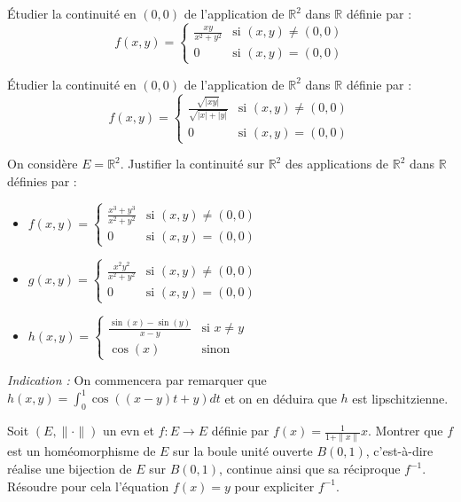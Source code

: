 \begin{exercice}
Étudier la continuité en $(0,0)$ de l'application de $\mathbb{R}^{2}$ dans $\mathbb{R}$ définie par :
$$ f(x,y) = \begin{cases} \frac{xy}{x^{2}+y^{2}} & \text{si } (x,y) \neq (0,0) \\ 0 & \text{si } (x,y) = (0,0) \end{cases} $$
\end{exercice}

\begin{exercice}
Étudier la continuité en $(0,0)$ de l'application de $\mathbb{R}^{2}$ dans $\mathbb{R}$ définie par :
$$ f(x,y) = \begin{cases} \frac{\sqrt{|xy|}}{\sqrt{|x|+|y|}} & \text{si } (x,y) \neq (0,0) \\ 0 & \text{si } (x,y) = (0,0) \end{cases} $$
\end{exercice}

\begin{exercice}
On considère $E=\mathbb{R}^{2}$. Justifier la continuité sur $\mathbb{R}^{2}$ des applications de $\mathbb{R}^{2}$ dans $\mathbb{R}$ définies par :
\begin{itemize}
    \item $f(x,y) = \begin{cases} \frac{x^{3}+y^{3}}{x^{2}+y^{2}} & \text{si } (x,y) \neq (0,0) \\ 0 & \text{si } (x,y) = (0,0) \end{cases}$
    \item $g(x,y) = \begin{cases} \frac{x^{2}y^{2}}{x^{2}+y^{2}} & \text{si } (x,y) \neq (0,0) \\ 0 & \text{si } (x,y) = (0,0) \end{cases}$
    \item $h(x,y) = \begin{cases} \frac{\sin(x)-\sin(y)}{x-y} & \text{si } x \neq y \\ \cos(x) & \text{sinon} \end{cases}$
\end{itemize}
\textit{Indication :} On commencera par remarquer que $h(x,y) = \int_{0}^{1} \cos((x-y)t+y) dt$ et on en déduira que $h$ est lipschitzienne.
\end{exercice}

\begin{exercice}
Soit $(E, \| \cdot \|)$ un evn et $f: E \rightarrow E$ définie par $f(x) = \frac{1}{1+\|x\|}x$.
Montrer que $f$ est un homéomorphisme de $E$ sur la boule unité ouverte $B(0,1)$, c'est-à-dire réalise une bijection de $E$ sur $B(0,1)$, continue ainsi que sa réciproque $f^{-1}$.
Résoudre pour cela l'équation $f(x)=y$ pour expliciter $f^{-1}$.
\end{exercice}

